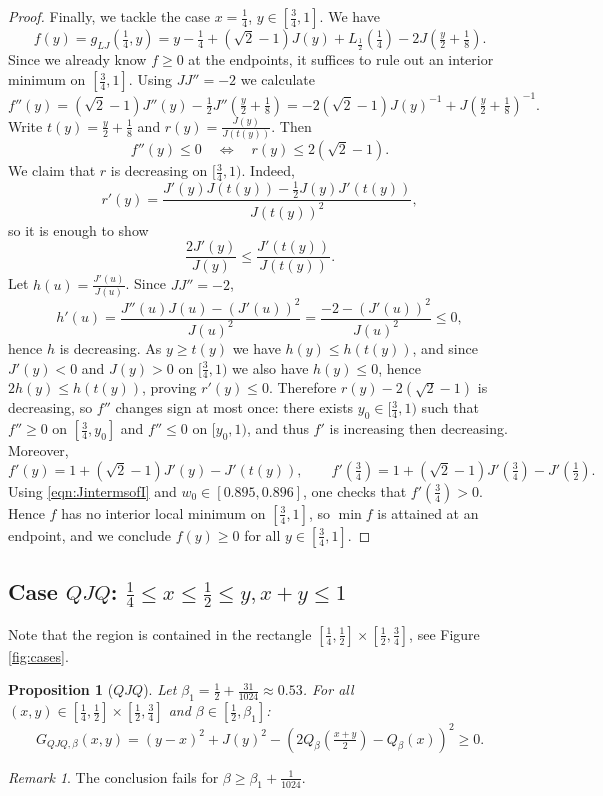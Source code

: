 \documentclass[12pt]{amsart}
\theoremstyle{plain}
\newtheorem{prop}[thm]{Proposition}
\theoremstyle{definition}
\theoremstyle{remark}
\newtheorem{rem}[thm]{Remark}
\numberwithin{equation}{section}
\begin{document}
\begin{proof}
Finally, we tackle the case $x=\tfrac{1}{4}$, $y\in [\tfrac{3}{4},1]$. We have \[ f(y)=g_{LJ}(\tfrac{1}{4},y)=y-\tfrac{1}{4}+(\sqrt{2}-1) J(y)+L_{\frac{1}{2}}(\tfrac{1}{4})-2J(\tfrac{y}{2} + \tfrac{1}{8}). \] 
Since we already know $f\ge 0$ at the endpoints, it suffices to rule out an interior minimum on $[\tfrac{3}{4},1]$. Using $JJ''=-2$ we calculate \[ f''(y) = (\sqrt{2}-1) J''(y) - \tfrac{1}{2}J''(\tfrac{y}{2} + \tfrac{1}{8}) = -2(\sqrt{2}-1) J(y)^{-1}+J(\tfrac{y}{2} + \tfrac{1}{8})^{-1}. \] 
Write $t(y)=\tfrac{y}{2}+\tfrac{1}{8}$ and $r(y)=\frac{J(y)}{J(t(y))}$. 
Then \[ f''(y)\le 0 \quad\Longleftrightarrow\quad r(y)\le 2(\sqrt{2}-1). \] 
We claim that $r$ is decreasing on $[\tfrac{3}{4},1)$. 
Indeed, \[ r'(y)=\frac{J'(y)J(t(y))-\tfrac{1}{2}J(y)J'(t(y))}{J(t(y))^2}, \] so it is enough to show \[ \frac{2J'(y)}{J(y)} \le \frac{J'(t(y))}{J(t(y))}. \] 
Let $h(u)=\frac{J'(u)}{J(u)}$. Since $JJ''=-2$, \[ h'(u)=\frac{J''(u)J(u)-(J'(u))^2}{J(u)^2}=\frac{-2-(J'(u))^2}{J(u)^2}\le 0, \] hence $h$ is decreasing. 
As $y\ge t(y)$ we have $h(y)\le h(t(y))$, and since $J'(y)<0$ and $J(y)>0$ on $[\tfrac{3}{4},1)$ we also have $h(y)\le 0$, hence $2h(y)\le h(t(y))$, proving $r'(y)\le 0$. 
Therefore $r(y)-2(\sqrt2-1)$ is decreasing, so $f''$ changes sign at most once: there exists $y_0\in[\tfrac{3}{4},1)$ such that $f''\ge 0$ on $[\tfrac{3}{4},y_0]$ and $f''\le 0$ on $[y_0,1)$, and thus $f'$ is increasing then decreasing. 
Moreover, \[ f'(y)=1+(\sqrt{2}-1)J'(y)-J'(t(y)), \qquad f'(\tfrac{3}{4})=1+(\sqrt{2}-1)J'(\tfrac{3}{4})-J'(\tfrac{1}{2}). \] Using \eqref{eqn:JintermsofI} and $w_0\in[0.895,0.896]$, one checks that $f'(\tfrac{3}{4})>0$. 
Hence $f$ has no interior local minimum on $[\tfrac{3}{4},1]$, so $\min f$ is attained at an endpoint, and we conclude $f(y)\ge 0$ for all $y\in[\tfrac{3}{4},1]$.

\end{proof}




\subsection{\texorpdfstring{Case $QJQ$: $\frac14\leq x\leq \frac12\leq y, x+y\leq 1$}{Case QJQ}}
\label{sec:caseQJQ}
Note that the region is contained in the rectangle $[\frac14,\frac12]\times [\frac12,\frac34]$, see Figure \ref{fig:cases}.

\begin{prop}[$QJQ$]
Let $\beta_1=\tfrac12+\tfrac{31}{1024}\approx 0.53$.
For all $(x,y)\in [\frac14,\frac12]\times [\frac12,\frac34]$ and $\beta\in [\tfrac12, \beta_1]$:
\begin{equation}\label{eqn:QJQclaim}
G_{QJQ,\beta}(x,y)=(y-x)^2 + J(y)^2 - (2Q_\beta(\tfrac{x+y}{2})-Q_\beta(x))^2 \geq 0.
\end{equation}
\end{prop}
\begin{rem}
The conclusion fails for $\beta\ge \beta_1+\tfrac1{1024}$. 
\end{rem}
\end{document}
